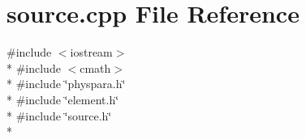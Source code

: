 \section{source.\-cpp File Reference}
\label{source_8cpp}
{\ttfamily \#include $<$iostream$>$}\\*
{\ttfamily \#include $<$cmath$>$}\\*
{\ttfamily \#include \char`\"{}physpara.\-h\char`\"{}}\\*
{\ttfamily \#include \char`\"{}element.\-h\char`\"{}}\\*
{\ttfamily \#include \char`\"{}source.\-h\char`\"{}}\\*
